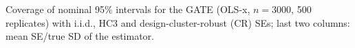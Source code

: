 \begin{table}[t]
\caption{Coverage of nominal 95\% intervals for the GATE (OLS-x, $n{=}3000$, 500 replicates) with i.i.d., HC3 and design-cluster-robust (CR) SEs; last two columns: mean SE/true SD of the estimator.}\label{tab:e7}
\centering\scriptsize
\setlength{\tabcolsep}{2pt}

\end{table}
